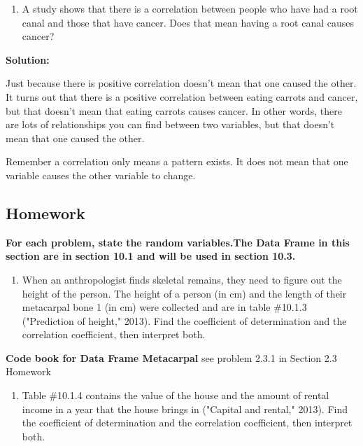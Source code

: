 \documentclass[
]{book}
\providecommand{\tightlist}{%
  \setlength{\itemsep}{0pt}\setlength{\parskip}{0pt}}
\begin{document}
\begin{enumerate}
\def\labelenumi{\alph{enumi}.}
\setcounter{enumi}{1}
\tightlist
\item
  A study shows that there is a correlation between people who have had a root canal and those that have cancer. Does that mean having a root canal causes cancer?
\end{enumerate}

\textbf{Solution:}

Just because there is positive correlation doesn't mean that one caused the other. It turns out that there is a positive correlation between eating carrots and cancer, but that doesn't mean that eating carrots causes cancer. In other words, there are lots of relationships you can find between two variables, but that doesn't mean that one caused the other.

Remember a correlation only means a pattern exists. It does not mean that one variable causes the other variable to change.

\hypertarget{homework-1}{%
\subsection{Homework}\label{homework-1}}

\textbf{For each problem, state the random variables.The Data Frame in this section are in section 10.1 and will be used in section 10.3.}

\begin{enumerate}
\def\labelenumi{\arabic{enumi}.}
\tightlist
\item
  When an anthropologist finds skeletal remains, they need to figure out the height of the person. The height of a person (in cm) and the length of their metacarpal bone 1 (in cm) were collected and are in table \#10.1.3 ("Prediction of height," 2013). Find the coefficient of determination and the correlation coefficient, then interpret both.
\end{enumerate}

\textbf{Code book for Data Frame Metacarpal} see problem 2.3.1 in Section 2.3 Homework

\begin{enumerate}
\def\labelenumi{\arabic{enumi}.}
\setcounter{enumi}{1}
\tightlist
\item
  Table \#10.1.4 contains the value of the house and the amount of rental income in a year that the house brings in ("Capital and rental," 2013). Find the coefficient of determination and the correlation coefficient, then interpret both.
\end{enumerate}
\end{document}
